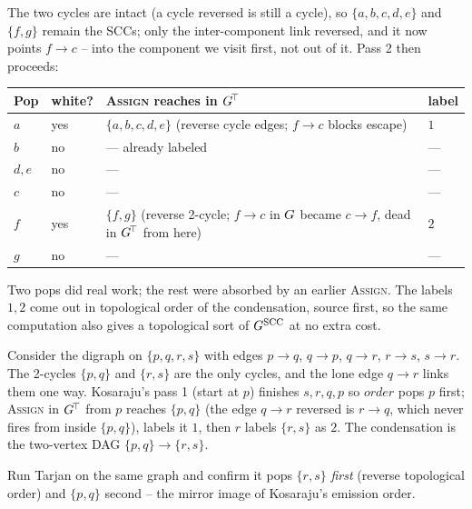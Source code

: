 The two cycles are intact (a cycle reversed is still a cycle), so $\{a,b,c,d,e\}$ and $\{f,g\}$ remain the SCCs; only the inter-component link reversed, and it now points $f\to c$ -- into the component we visit first, not out of it. Pass 2 then proceeds:

\begin{center}\small
\begin{longtable}{l l l l}
\toprule
Pop & white? & \textsc{Assign} reaches in $G^{\!\top}$ & label \\
\midrule
$a$ & yes & $\{a,b,c,d,e\}$ (reverse cycle edges; $f\to c$ blocks escape) & $1$ \\
$b$ & no  & --- already labeled & --- \\
$d,e$ & no & --- & --- \\
$c$ & no  & --- & --- \\
$f$ & yes & $\{f,g\}$ (reverse 2-cycle; $f\to c$ in $G$ became $c\to f$, dead in $G^{\!\top}$ from here) & $2$ \\
$g$ & no  & --- & --- \\
\bottomrule
\end{longtable}
\end{center}

Two pops did real work; the rest were absorbed by an earlier \textsc{Assign}. The labels $1,2$ come out in topological order of the condensation, source first, so the same computation also gives a topological sort of $G^{\mathrm{SCC}}$ at no extra cost.

\begin{example}
\label{ch05:ex-chain}
Consider the digraph on $\{p,q,r,s\}$ with edges $p\to q$, $q\to p$, $q\to r$, $r\to s$, $s\to r$. The 2-cycles $\{p,q\}$ and $\{r,s\}$ are the only cycles, and the lone edge $q\to r$ links them one way. Kosaraju's pass 1 (start at $p$) finishes $s,r,q,p$ so $\mathit{order}$ pops $p$ first; \textsc{Assign} in $G^{\!\top}$ from $p$ reaches $\{p,q\}$ (the edge $q\to r$ reversed is $r\to q$, which never fires from inside $\{p,q\}$), labels it $1$, then $r$ labels $\{r,s\}$ as $2$. The condensation is the two-vertex DAG $\{p,q\}\to\{r,s\}$.

\begin{center}
\end{center}
Run Tarjan on the same graph and confirm it pops $\{r,s\}$ \emph{first} (reverse topological order) and $\{p,q\}$ second -- the mirror image of Kosaraju's emission order.
\end{example}

